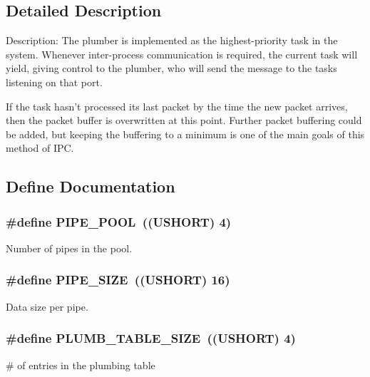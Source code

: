 \subsection{Detailed Description}
Description: The plumber is implemented as the highest-\/priority task in the system. Whenever inter-\/process communication is required, the current task will yield, giving control to the plumber, who will send the message to the tasks listening on that port.

If the task hasn't processed its last packet by the time the new packet arrives, then the packet buffer is overwritten at this point. Further packet buffering could be added, but keeping the buffering to a minimum is one of the main goals of this method of IPC. 

\subsection{Define Documentation}
\subsubsection[{PIPE\_\-POOL}]{\setlength{\rightskip}{0pt plus 5cm}\#define PIPE\_\-POOL~((USHORT) 4)}\label{plumber_8h_a3aa9f28a0af6f689cfb86ff26938f832}


Number of pipes in the pool. 
\subsubsection[{PIPE\_\-SIZE}]{\setlength{\rightskip}{0pt plus 5cm}\#define PIPE\_\-SIZE~((USHORT) 16)}\label{plumber_8h_abc6a1fc471b3060f967ad4e5e1916f03}


Data size per pipe. 
\subsubsection[{PLUMB\_\-TABLE\_\-SIZE}]{\setlength{\rightskip}{0pt plus 5cm}\#define PLUMB\_\-TABLE\_\-SIZE~((USHORT) 4)}\label{plumber_8h_a683901ffd6f5a419c26605b788cc0646}


\# of entries in the plumbing table 
